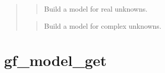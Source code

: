 \documentclass[a4paper,11pt,english]{sphinxmanual}
\begin{document}
\begin{quote}

\begin{quote}

Build a model for real unknowns.
\end{quote}

\begin{quote}

Build a model for complex unknowns.
\end{quote}
\end{quote}


\section{gf\_model\_get}
\label{\detokenize{matlab_octave/cmdref_gf_model_get:gf-model-get}}\label{\detokenize{matlab_octave/cmdref_gf_model_get::doc}}
\end{document}
